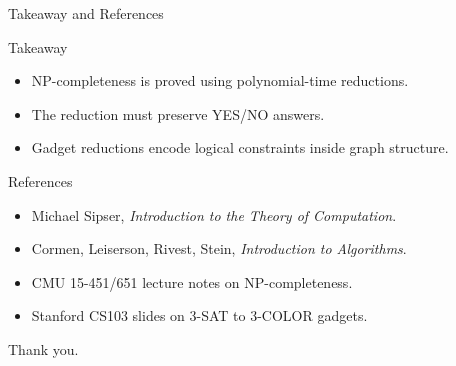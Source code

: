 \documentclass[aspectratio=43,8pt]{beamer}
\begin{document}
\begin{frame}{Takeaway and References}
\begin{block}{Takeaway}
\begin{itemize}
    \item NP-completeness is proved using polynomial-time reductions.
    \item The reduction must preserve YES/NO answers.
    \item Gadget reductions encode logical constraints inside graph structure.
\end{itemize}
\end{block}
\begin{block}{References}
\begin{itemize}
    \item Michael Sipser, \emph{Introduction to the Theory of Computation}.
    \item Cormen, Leiserson, Rivest, Stein, \emph{Introduction to Algorithms}.
    \item CMU 15-451/651 lecture notes on NP-completeness.
    \item Stanford CS103 slides on 3-SAT to 3-COLOR gadgets.
\end{itemize}
\end{block}
\vspace{0.1cm}
\begin{center}
\small Thank you.
\end{center}
\end{frame}
\end{document}
